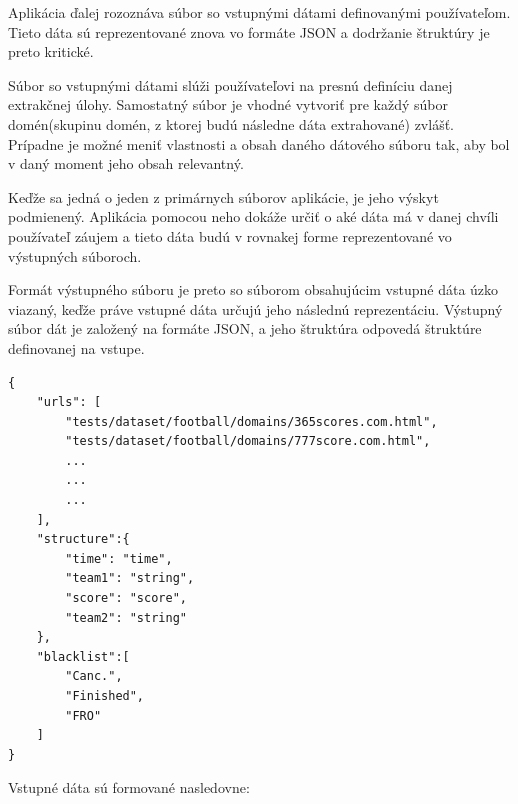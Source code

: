 Aplikácia ďalej rozoznáva súbor so vstupnými dátami definovanými používateľom. Tieto dáta sú reprezentované znova vo formáte JSON a dodržanie štruktúry je preto kritické. 

Súbor so vstupnými dátami slúži používateľovi na presnú definíciu danej extrakčnej úlohy. Samostatný súbor je vhodné vytvoriť pre každý súbor domén(skupinu domén, z ktorej budú následne dáta extrahované) zvlášť. Prípadne je možné meniť vlastnosti a obsah daného dátového súboru tak, aby bol v daný moment jeho obsah relevantný. 

Keďže sa jedná o jeden z primárnych súborov aplikácie, je jeho výskyt podmienený. Aplikácia pomocou neho dokáže určiť o aké dáta má v danej chvíli používateľ záujem a tieto dáta budú v rovnakej forme reprezentované vo výstupných súboroch.

Formát výstupného súboru je preto so súborom obsahujúcim vstupné dáta úzko viazaný, keďže práve vstupné dáta určujú jeho následnú reprezentáciu. Výstupný súbor dát je založený na formáte JSON, a jeho štruktúra odpovedá štruktúre definovanej na vstupe.

\bigskip

\begin{lstlisting}[caption={Príklad dátového súboru},captionpos=b,label={data_ex}]
{
    "urls": [
        "tests/dataset/football/domains/365scores.com.html",
        "tests/dataset/football/domains/777score.com.html",
        ...
        ...
        ...
    ],
    "structure":{
        "time": "time",
        "team1": "string",
        "score": "score",
        "team2": "string"
    },
    "blacklist":[
        "Canc.",
        "Finished",
        "FRO"
    ]
}
\end{lstlisting}

\bigskip

Vstupné dáta sú formované nasledovne:

